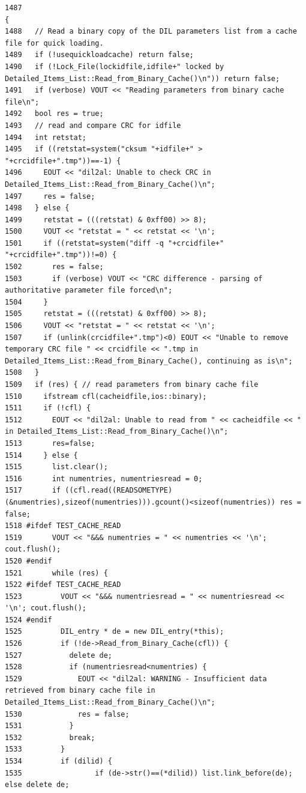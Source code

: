 \footnotesize\begin{verbatim}1487                                                                       {
1488   // Read a binary copy of the DIL parameters list from a cache file for quick loading.
1489   if (!usequickloadcache) return false;
1490   if (!Lock_File(lockidfile,idfile+" locked by Detailed_Items_List::Read_from_Binary_Cache()\n")) return false;
1491   if (verbose) VOUT << "Reading parameters from binary cache file\n";
1492   bool res = true;
1493   // read and compare CRC for idfile
1494   int retstat;
1495   if ((retstat=system("cksum "+idfile+" > "+crcidfile+".tmp"))==-1) {
1496     EOUT << "dil2al: Unable to check CRC in Detailed_Items_List::Read_from_Binary_Cache()\n";
1497     res = false;
1498   } else {
1499     retstat = (((retstat) & 0xff00) >> 8);
1500     VOUT << "retstat = " << retstat << '\n';
1501     if ((retstat=system("diff -q "+crcidfile+" "+crcidfile+".tmp"))!=0) {
1502       res = false;
1503       if (verbose) VOUT << "CRC difference - parsing of authoritative parameter file forced\n";
1504     }
1505     retstat = (((retstat) & 0xff00) >> 8);
1506     VOUT << "retstat = " << retstat << '\n';
1507     if (unlink(crcidfile+".tmp")<0) EOUT << "Unable to remove temporary CRC file " << crcidfile << ".tmp in Detailed_Items_List::Read_from_Binary_Cache(), continuing as is\n";
1508   }
1509   if (res) { // read parameters from binary cache file
1510     ifstream cfl(cacheidfile,ios::binary);
1511     if (!cfl) {
1512       EOUT << "dil2al: Unable to read from " << cacheidfile << " in Detailed_Items_List::Read_from_Binary_Cache()\n";
1513       res=false;
1514     } else {
1515       list.clear();
1516       int numentries, numentriesread = 0;
1517       if ((cfl.read((READSOMETYPE) (&numentries),sizeof(numentries))).gcount()<sizeof(numentries)) res = false;
1518 #ifdef TEST_CACHE_READ
1519       VOUT << "&&& numentries = " << numentries << '\n'; cout.flush();
1520 #endif
1521       while (res) {
1522 #ifdef TEST_CACHE_READ
1523         VOUT << "&&& numentriesread = " << numentriesread << '\n'; cout.flush();
1524 #endif
1525         DIL_entry * de = new DIL_entry(*this);
1526         if (!de->Read_from_Binary_Cache(cfl)) { 
1527           delete de;
1528           if (numentriesread<numentries) {
1529             EOUT << "dil2al: WARNING - Insufficient data retrieved from binary cache file in Detailed_Items_List::Read_from_Binary_Cache()\n";
1530             res = false;
1531           }
1532           break;
1533         }
1534         if (dilid) {
1535                 if (de->str()==(*dilid)) list.link_before(de); else delete de;

\end{verbatim}
